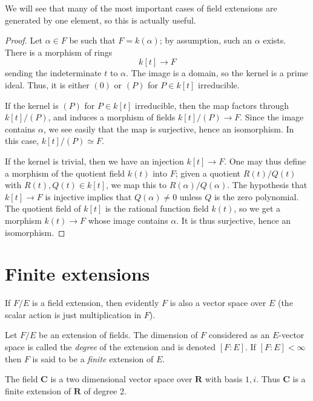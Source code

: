 \noindent
We will see that many of the most important cases of field extensions are
generated by one element, so this is actually useful.

\begin{proof}
Let $\alpha \in F$ be such that $F = k(\alpha)$; by assumption, such an
$\alpha$ exists. There is a morphism of rings
$$
k[t] \to F
$$
sending the indeterminate $t$ to $\alpha$. The image is a domain, so the
kernel is a prime ideal. Thus, it is either $(0)$ or $(P)$ for $P \in k[t]$
irreducible.

\medskip\noindent
If the kernel is $(P)$ for $P \in k[t]$ irreducible, then the map factors
through $k[t]/(P)$, and induces a morphism of fields $k[t]/(P) \to F$. Since
the image contains $\alpha$, we see easily that the map is surjective, hence
an isomorphism. In this case, $k[t]/(P) \simeq F$.

\medskip\noindent
If the kernel is trivial, then we have an injection $k[t] \to F$.
One may thus define a morphism of the quotient field $k(t)$ into $F$; given a
quotient $R(t)/Q(t)$ with $R(t), Q(t) \in k[t]$, we map this to
$R(\alpha)/Q(\alpha)$. The hypothesis that $k[t] \to F$ is injective implies
that $Q(\alpha) \neq 0$ unless $Q$ is the zero polynomial.
The quotient field of $k[t]$ is the rational function field $k(t)$, so we get
a morphism $k(t) \to F$
whose image contains $\alpha$. It is thus surjective, hence an isomorphism.
\end{proof}




\section{Finite extensions}
\label{section-finite-extensions}

\noindent
If $F/E$ is a field extension, then evidently $F$ is also a vector space
over $E$ (the scalar action is just multiplication in $F$).

\begin{definition}
\label{definition-degree}
Let $F/E$ be an extension of fields. The dimension of $F$ considered as an
$E$-vector space is called the {\it degree} of the extension and is
denoted $[F : E]$. If $[F : E]<\infty$ then $F$ is said to be a
{\it finite} extension of $E$.
\end{definition}

\begin{example}
\label{example-C-over-R}
The field $\mathbf{C}$ is a two dimensional vector space over $\mathbf{R}$
with basis $1, i$. Thus $\mathbf{C}$ is a finite extension of $\mathbf{R}$
of degree 2.
\end{example}

